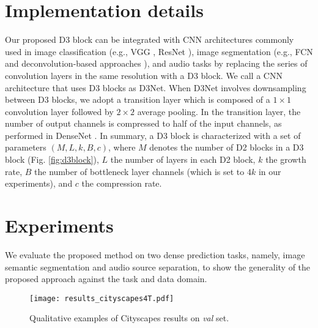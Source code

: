\documentclass[final]{cvpr}
\begin{document}
\section{Implementation details}
Our proposed D3 block can be integrated with CNN architectures commonly used in image classification (e.g., VGG \cite{Zisserman2015VGG}, ResNet \cite{He16ResNet}), image segmentation (e.g., FCN \cite{Long15} and deconvolution-based approaches \cite{Noh15,Ronneberger15UNet, Fu19}), and audio tasks \cite{Takahashi17} by replacing the series of convolution layers in the same resolution with a D3 block. We call a CNN architecture that uses D3 blocks as D3Net. When D3Net involves downsampling between D3 blocks, we adopt a transition layer which is composed of a $1\times1$ convolution layer followed by $2\times2$ average pooling. In the transition layer, the number of output channels is compressed to half of the input channels, as performed in DenseNet \cite{Huang17Densenet}.
In summary, a D3 block is characterized with a set of parameters $(M,L,k,B,c)$, where $M$ denotes the number of D2 blocks in a D3 block (Fig. \ref{fig:d3block}), $L$ the number of layers in each D2 block, $k$ the growth rate, $B$ the number of bottleneck layer channels (which is set to $4k$ in our experiments), and $c$ the compression rate.

\section{Experiments}
We evaluate the proposed method on two dense prediction tasks, namely, image semantic segmentation and audio source separation, to show the generality of the proposed approach against the task and data domain.


\begin{figure}[t]
  \centering
  \texttt{[image: results\_cityscapes4T.pdf]}
  \caption{Qualitative examples of Cityscapes results on \textit{val} set.}
  \label{fig:results_cityscapes}
\end{figure}
\end{document}
